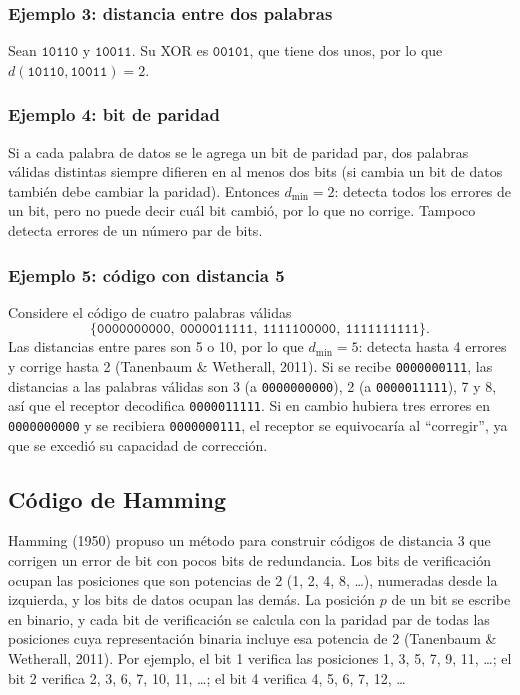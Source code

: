 \documentclass[12pt,letterpaper]{article}
\newcommand{\bits}[1]{\texttt{#1}}
\begin{document}
\subsubsection*{Ejemplo 3: distancia entre dos palabras}
Sean $\bits{10110}$ y $\bits{10011}$. Su XOR es $\bits{00101}$, que tiene dos unos, por lo que $d(\bits{10110},\bits{10011}) = 2$.

\subsubsection*{Ejemplo 4: bit de paridad}
Si a cada palabra de datos se le agrega un bit de paridad par, dos palabras válidas distintas siempre difieren en al menos dos bits (si cambia un bit de datos también debe cambiar la paridad). Entonces $d_{\min}=2$: detecta todos los errores de un bit, pero no puede decir cuál bit cambió, por lo que no corrige. Tampoco detecta errores de un número par de bits.

\subsubsection*{Ejemplo 5: código con distancia 5}
Considere el código de cuatro palabras válidas
\[ \{\bits{0000000000},\ \bits{0000011111},\ \bits{1111100000},\ \bits{1111111111}\}. \]
Las distancias entre pares son 5 o 10, por lo que $d_{\min}=5$: detecta hasta 4 errores y corrige hasta 2 (Tanenbaum \& Wetherall, 2011). Si se recibe \bits{0000000111}, las distancias a las palabras válidas son 3 (a \bits{0000000000}), 2 (a \bits{0000011111}), 7 y 8, así que el receptor decodifica \bits{0000011111}. Si en cambio hubiera tres errores en \bits{0000000000} y se recibiera \bits{0000000111}, el receptor se equivocaría al ``corregir'', ya que se excedió su capacidad de corrección.

\subsection{Código de Hamming}
Hamming (1950) propuso un método para construir códigos de distancia 3 que corrigen un error de bit con pocos bits de redundancia. Los bits de verificación ocupan las posiciones que son potencias de 2 (1, 2, 4, 8, \ldots), numeradas desde la izquierda, y los bits de datos ocupan las demás. La posición $p$ de un bit se escribe en binario, y cada bit de verificación se calcula con la paridad par de todas las posiciones cuya representación binaria incluye esa potencia de 2 (Tanenbaum \& Wetherall, 2011). Por ejemplo, el bit 1 verifica las posiciones 1, 3, 5, 7, 9, 11, \ldots; el bit 2 verifica 2, 3, 6, 7, 10, 11, \ldots; el bit 4 verifica 4, 5, 6, 7, 12, \ldots
\end{document}
